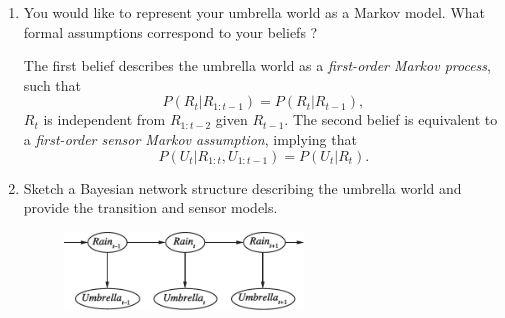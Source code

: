 \documentclass[11pt, a4paper]{article}
\begin{document}
\begin{enumerate}
    \item You would like to represent your umbrella world as a Markov model. What formal assumptions correspond to your beliefs ?

    \begin{solution}
        The first belief describes the umbrella world as a \emph{first-order Markov process}, such that
        \begin{equation*}
            P(R_t | R_{1:t-1}) = P(R_t | R_{t-1}),
        \end{equation*}
        \ie{} $R_t$ is independent from $R_{1:t - 2}$ given $R_{t-1}$. The second belief is equivalent to a \emph{first-order sensor Markov assumption}, implying that
        \begin{equation*}
            P(U_t | R_{1:t}, U_{1:t-1}) = P(U_t | R_{t}).
        \end{equation*}
    \end{solution}

    \item Sketch a Bayesian network structure describing the umbrella world and provide the transition and sensor models.

    \begin{solution}
        \begin{figure}[H]
            \centering
            \includegraphics[width=0.6\textwidth]{figures/e4_umbrella.pdf}
        \end{figure}


\end{solution}
\end{enumerate}
\end{document}
